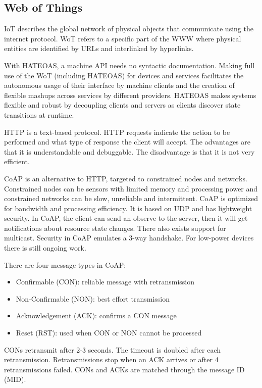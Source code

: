 \subsection{Web of Things}
\begin{mytitle} IoT describes the global network of physical objects that communicate using the internet protocol. WoT refers to a specific part of the WWW where physical entities are identified by URLs and interlinked by hyperlinks.
\end{mytitle}
\begin{mytitle} With HATEOAS, a machine API needs no syntactic documentation. Making full use of the WoT (including HATEOAS) for devices and services facilitates the autonomous usage of their interface by machine clients and the creation of flexible mashups across services by different providers. HATEOAS makes systems flexible and robust by decoupling clients and servers as clients discover state transitions at runtime.
\end{mytitle}
\begin{mytitle}[HTTP] HTTP is a text-based protocol. HTTP requests indicate the action to be performed and what type of response the client will accept. The advantages are that it is understandable and debuggable. The disadvantage is that it is not very efficient. 
\end{mytitle}
\begin{mytitle} CoAP is an alternative to HTTP, targeted to constrained nodes and networks. Constrained nodes can be sensors with limited memory and processing power and constrained networks can be slow, unreliable and intermittent. CoAP is optimized for bandwidth and processing efficiency. It is based on UDP and has lightweight security. In CoAP, the client can send an observe to the server, then it will get notifications about resource state changes. There also exists support for multicast. Security in CoAP emulates a 3-way handshake. For low-power devices there is still ongoing work.
    \begin{mysubtitle} There are four message types in CoAP:
    \begin{itemize}
        \item Confirmable (CON): reliable message with retransmission
        \item Non-Confirmable (NON): best effort transmission
        \item Acknowledgement (ACK): confirms a CON message
        \item Reset (RST): used when CON or NON cannot be processed
    \end{itemize}
    CONs retransmit after 2-3 seconds. The timeout is doubled after each retransmission. Retransmissions stop when an ACK arrives or after 4 retransmissions failed. CONs and ACKs are matched through the message ID (MID).
    \end{mysubtitle}
\end{mytitle}
